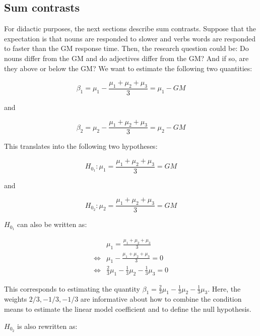 \documentclass[12pt,]{krantz}
\begin{document}
\hypertarget{sumcontrasts}{%
\subsection{Sum contrasts}\label{sumcontrasts}}

For didactic purposes, the next sections describe sum contrasts. Suppose that the expectation is that nouns are responded to slower and verbs words are responded to faster than the GM response time. Then, the research question could be: Do nouns differ from the GM and do adjectives differ from the GM? And if so, are they above or below the GM? We want to estimate the following two quantities:

\begin{equation}
\beta_1 = \mu_1 - \frac{\mu_1+\mu_2+\mu_3}{3} = \mu_1 - GM
\end{equation}

\noindent
and

\begin{equation}
\beta_2 = \mu_2 - \frac{\mu_1+\mu_2+\mu_3}{3} = \mu_2 - GM
\end{equation}

This translates into the following two hypotheses:

\begin{equation}
H_{0_1}: \mu_1 = \frac{\mu_1+\mu_2+\mu_3}{3} = GM
\end{equation}

\noindent
and

\begin{equation}
H_{0_2}: \mu_2 = \frac{\mu_1+\mu_2+\mu_3}{3} = GM
\end{equation}

\(H_{0_1}\) can also be written as:

\begin{align} \label{h01}
& \mu_1 =\frac{\mu_1+\mu_2+\mu_3}{3}\\
\Leftrightarrow & \mu_1 - \frac{\mu_1+\mu_2+\mu_3}{3} = 0\\
\Leftrightarrow & \frac{2}{3} \mu_1 - \frac{1}{3}\mu_2 - \frac{1}{3}\mu_3 = 0
\end{align}

\noindent
This corresponds to estimating the quantity \(\beta_1 = \frac{2}{3} \mu_1 - \frac{1}{3}\mu_2 - \frac{1}{3}\mu_3\).
Here, the weights \(2/3, -1/3, -1/3\) are informative about how to combine the condition means to estimate the linear model coefficient and to define the null hypothesis.

\(H_{0_2}\) is also rewritten as:
\end{document}
